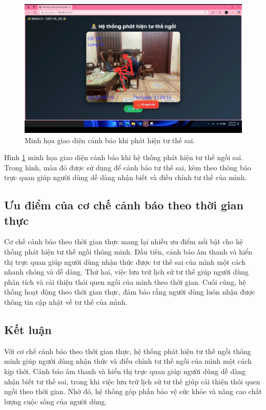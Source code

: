 \documentclass[conference]{IEEEtran}
\begin{document}
\begin{figure}[H]
    \centering
    \includegraphics[width=0.9\linewidth]{images/warning_display.png}
    \caption{Minh họa giao diện cảnh báo khi phát hiện tư thế sai.}
    \label{fig:warning_display}
\end{figure}

Hình \ref{fig:warning_display} minh họa giao diện cảnh báo khi hệ thống phát hiện tư thế ngồi sai. Trong hình, màu đỏ được sử dụng để cảnh báo tư thế sai, kèm theo thông báo trực quan giúp người dùng dễ dàng nhận biết và điều chỉnh tư thế của mình.

\subsection{Ưu điểm của cơ chế cảnh báo theo thời gian thực}
Cơ chế cảnh báo theo thời gian thực mang lại nhiều ưu điểm nổi bật cho hệ thống phát hiện tư thế ngồi thông minh. Đầu tiên, cảnh báo âm thanh và hiển thị trực quan giúp người dùng nhận thức được tư thế sai của mình một cách nhanh chóng và dễ dàng. Thứ hai, việc lưu trữ lịch sử tư thế giúp người dùng phân tích và cải thiện thói quen ngồi của mình theo thời gian. Cuối cùng, hệ thống hoạt động theo thời gian thực, đảm bảo rằng người dùng luôn nhận được thông tin cập nhật về tư thế của mình.

\subsection{Kết luận}
Với cơ chế cảnh báo theo thời gian thực, hệ thống phát hiện tư thế ngồi thông minh giúp người dùng nhận thức và điều chỉnh tư thế ngồi của mình một cách kịp thời. Cảnh báo âm thanh và hiển thị trực quan giúp người dùng dễ dàng nhận biết tư thế sai, trong khi việc lưu trữ lịch sử tư thế giúp cải thiện thói quen ngồi theo thời gian. Nhờ đó, hệ thống góp phần bảo vệ sức khỏe và nâng cao chất lượng cuộc sống của người dùng.
\end{document}
